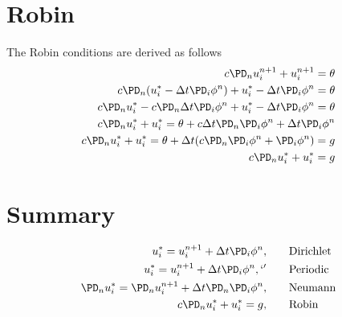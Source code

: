 \documentclass[landscape]{article}
\newcommand{\PSCHAIN}{..}
\newcommand{\rootdir}{\PSCHAIN}
\begin{document}
\section{Robin}
The Robin conditions are derived as follows
\begin{equation}\begin{aligned}
  c \PD_n u_i^{n+1} + u_i^{n+1} = \theta \\
  c \PD_n (u_i^* - \Delta t \PD_i \phi^n) + u_i^* - \Delta t \PD_i \phi^n = \theta \\
  c \PD_n u_i^* - c \PD_n \Delta t \PD_i \phi^n + u_i^* - \Delta t \PD_i \phi^n = \theta \\
  c \PD_n u_i^* + u_i^* = \theta + c \Delta t \PD_n \PD_i \phi^n + \Delta t \PD_i \phi^n \\
  c \PD_n u_i^* + u_i^* = \theta + \Delta t (c \PD_n \PD_i \phi^n + \PD_i \phi^n) = g \\
  c \PD_n u_i^* + u_i^* = g \\
\end{aligned}\end{equation}

\section{Summary}
\begin{equation}\begin{aligned}
  u_i^* = u_i^{n+1} + \Delta t \PD_i \phi^n, \qquad & \text{Dirichlet} \\
  u_i^* = u_i^{n+1} + \Delta t \PD_i \phi^n, `'\qquad & \text{Periodic} \\
  \PD_n u_i^* = \PD_n u_i^{n+1} + \Delta t \PD_n \PD_i \phi^n, \qquad & \text{Neumann} \\
  c \PD_n u_i^* + u_i^* = g, \qquad & \text{Robin} \\
\end{aligned}\end{equation}


\end{document}
